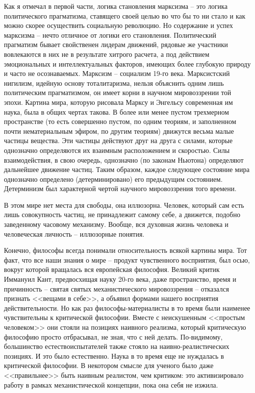 \documentclass{book}
\begin{document}
Как я отмечал в первой части, логика становления марксизма -- это логика политического прагматизма, ставящего своей целью во что бы то ни стало и как можно скорее осуществить социальную революцию. Но содержание и успех марксизма -- нечто отличное от логики его становления. Политический прагматизм бывает свойственен лидерам движений, рядовые же участники вовлекаются в них не в результате хитрого расчета, а под действием эмоциональных и интеллектуальных факторов, имеющих более глубокую природу и часто не осознаваемых. Марксизм -- социализм 19-го века. Марксистский нигилизм, идейную основу тоталитаризма, нельзя объяснить одним лишь политическим прагматизмом, он имеет корни в научном мировоззрении той эпохи.
Картина мира, которую рисовала Марксу и Энгельсу совре­менная им наука, была в общих чертах такова. В более или менее пустом трехмерном пространстве (то есть совершенно пустом, по одним теориям, и заполненном почти нематериальным эфиром, по другим теориям) движутся весьма малые частицы вещества. Эти частицы действуют друг на друга с силами, кото­рые однозначно определяются их взаимным расположением и скоростью. Силы взаимодействия, в свою очередь, однознач­но (по законам Ньютона) определяют дальнейшее движение частиц. Таким образом, каждое следующее состояние мира однозначно определено (детерминировано) его предыдущим состоянием. Детерминизм был характерной чертой научного мировоззрения того времени.

В этом мире нет места для свободы, она иллюзорна. Человек, который сам есть лишь совокупность частиц, не принадлежит самому себе, а движется, подобно заведенному часовому меха­низму. Вообще, вся духовная жизнь человека и человеческая личность -- иллюзорные понятия.

Конечно, философы всегда понимали относительность вся­кой картины мира. Тот факт, что все наши знания о мире -- продукт чувственного восприятия, был осью, вокруг которой вращалась вся европейская философия. Великий критик Иммануил Кант, предвосхищая науку 20-го века, даже пространство, время и причинность -- святая святых механистического мировоззрения -- отказался признать <<вещами в себе>>, а объявил формами нашего восприятия действительности. Но как раз философы-материалисты в то время были наименее чувствительны к критической философии. Вместе с неискушенным <<простым человеком>> они стояли на позициях наивного реализма, который критическую философию просто отбрасывал, не зная, что с ней делать. По-видимому, большинство естествоиспытателей также стояло на наивно-реалистических позициях. И это было естественно. Наука в то время еще не нуждалась в критической философии. В некотором смысле для ученого было даже <<правильнее>> быть наивным реалистом, чем критиком: это активизировало работу в рамках 
механистической 
концепции, пока она себя не изжила.
\end{document}
